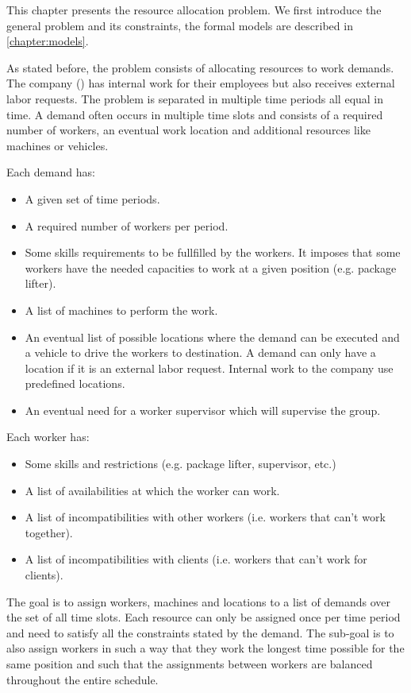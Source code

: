 \documentclass[../thesis.tex]{subfiles}
\begin{document}
This chapter presents the resource allocation problem.
We first introduce the general problem and its constraints, 
the formal models are described in \autoref{chapter:models}.

As stated before, the problem consists of allocating resources to work demands. 
The company (\vone) has internal work for their employees but also receives 
external labor requests. The problem is separated in multiple time periods all equal in time.
A demand often occurs in multiple time slots and consists of a required number of workers, an eventual 
work location and additional resources like machines or vehicles.

Each demand has:

\begin{itemize}
  \item A given set of time periods.
  \item A required number of workers per period.
  \item Some skills requirements to be fullfilled by the workers. 
  It imposes that some workers have the needed capacities to work at a given position (e.g. package lifter).
  \item A list of machines to perform the work.
  \item An eventual list of possible locations where the demand can be executed and a vehicle to drive the workers to destination.
  A demand can only have a location if it is an external labor request. Internal work to the company use predefined locations.
  \item An eventual need for a worker supervisor which will supervise the group.
\end{itemize}


Each worker has:

\begin{itemize}
  \item Some skills and restrictions (e.g. package lifter, supervisor, etc.)
  \item A list of availabilities at which the worker can work.
  \item A list of incompatibilities with other workers (i.e. workers that can't work together).
  \item A list of incompatibilities with clients (i.e. workers that can't work for clients).
\end{itemize}

The goal is to assign workers, machines and locations to a list of demands over the set of all time slots.
Each resource can only be assigned once per time period and need to satisfy all the constraints stated by the demand. 
The sub-goal is to also assign workers in such a way that they work the longest time possible for the same position and 
 such that the assignments between workers are balanced throughout the entire schedule.
\end{document}
